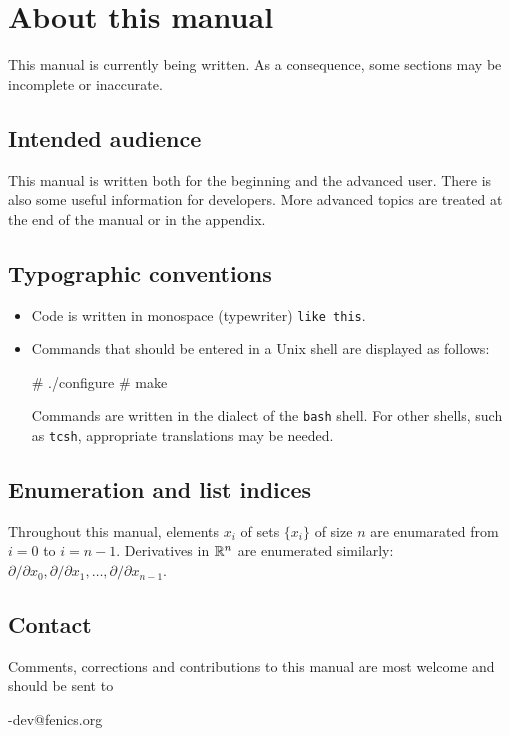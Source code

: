 
\chapter*{About this manual}

This manual is currently being written. As a consequence, some sections
may be incomplete or inaccurate.

\section*{Intended audience}

This manual is written both for the beginning and the advanced user.
There is also some useful information for developers. More advanced topics
are treated at the end of the manual or in the appendix.

\section*{Typographic conventions}

\begin{itemize}
\item
  Code is written in monospace (typewriter) \texttt{like this}.
\item
  Commands that should be entered in a Unix shell
  are displayed as follows:
  \begin{code}
 # ./configure
 # make
  \end{code}
  Commands are written in the dialect of the \texttt{bash} shell. For
  other shells, such as \texttt{tcsh}, appropriate translations may be
  needed.
\end{itemize}

\section*{Enumeration and list indices}

Throughout this manual, elements $x_i$ of sets $\{x_i\}$ of size $n$
are enumarated from $i = 0$ to $i = n-1$. Derivatives in $\mathbb{R}^n$ are
enumerated similarly: $\partial / \partial x_0, \partial / \partial
x_1, \ldots, \partial / \partial x_{n-1}$.

\section*{Contact}

Comments, corrections and contributions to this manual are most welcome
and should be sent to
\begin{code}
 \packagett{}-dev@fenics.org    
\end{code}
